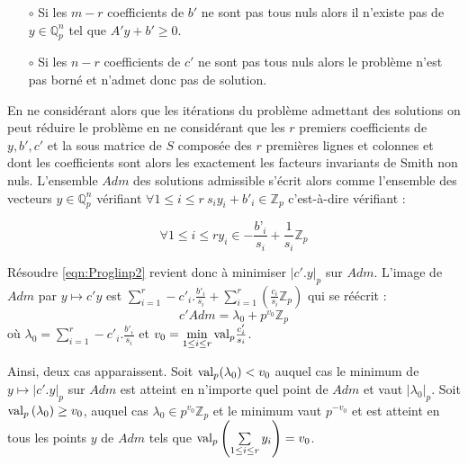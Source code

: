 \begin{propriete}
	\begin{itemize}~

		\item[$\circ$] Si les $m-r$ coefficients de $b'$ ne sont pas tous nuls alors il n'existe pas de $y \in \mathbb{Q}_{p} ^n$ tel que $A'y+b' \ge  0$.
	\item[$\circ$] Si les $n-r$ coefficients de $c'$ ne sont pas tous nuls alors le problème n'est pas borné et n'admet donc pas de solution. \end{itemize} 
\end{propriete}
En ne considérant alors que les itérations du problème admettant des solutions on peut réduire le problème en ne considérant que les $r$ premiers coefficients de $y, b', c'$ et la sous matrice de $S$ composée des $r$ premières lignes et colonnes et dont les coefficients sont alors les exactement les facteurs invariants de Smith non nuls. L'ensemble $Adm$ des solutions admissible s'écrit alors comme l'ensemble des vecteurs $y \in \mathbb{Q}_{ p } ^n$ vérifiant $
\forall 1 \le i\le r \ s_i y_i + b'_i \in \mathbb{Z}_p$ c'est-à-dire vérifiant :

\begin{equation}
	\forall 1 \le i\le r  y_i \in -\frac{b’_i}{s_i} + \frac{1}{s_i} \mathbb{Z}_p
\end{equation}
 

Résoudre \ref{eqn:Proglinp2} revient donc à minimiser $|c'.y|_p$ sur $Adm$. L'image de $Adm$ par $y \mapsto c'y$ est $\sum_{i=1}^r -c'_i.\frac{b'_i}{s_i} + \sum_{i=1}^r\left( \frac{c_i}{s_{i}} \mathbb{Z}_p \right)$ qui se réécrit :
$$c'Adm = \lambda_0 + p^{v_0} \mathbb{Z}_p$$
où $\lambda_0 = \sum\limits_{i=1}^r -c'_i.\frac{b'_i}{s_i}$ et $v_{0} = \min\limits_{1\le i\le r} \text{val}_p \frac{c'_{i}}{s_{i}} $.

Ainsi, deux cas apparaissent. Soit $\text{val}_p( \lambda_0) < v_0$ auquel cas le minimum de $y\mapsto |c'.y|_p$ sur $Adm$ est atteint en n'importe quel point de $Adm$ et vaut $| \lambda_0|_p$. Soit $\text{val}_p\left( \lambda_0 \right) \ge v_0$, auquel cas $\lambda_0 \in p^{v_0} \mathbb{Z}_p$ et le minimum vaut $p^{-v_0} $ et est atteint en tous les points $y$ de $Adm$ tels que $\text{val}_p\left(\sum \limits_{1\le i\le r} y_{i}\right) = v_0$.


